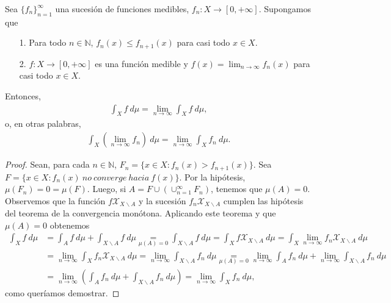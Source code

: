 \begin{teo}
Sea $\{f_n\}_{n=1}^{\infty}$ una sucesión de funciones medibles, $f_n: X \longrightarrow [0,+\infty]$. Supongamos que
\begin{enumerate}
    \item[1.] Para todo $n \in \mathbb{N}$, $f_n(x) \leq f_{n+1}(x)$ para casi todo $x \in X$.
    \item[2.] $f: X \longrightarrow [0,+\infty]$ es una función medible y $f(x) = \lim_{n \to \infty}{f_n(x)}$ para casi todo $x \in X$.
\end{enumerate}
Entonces,
\begin{align*}
    \int_{X}{f \ d\mu} = \lim_{n \to \infty}{\int_{X}{f \ d\mu}},
\end{align*}
o, en otras palabras,
\begin{align*}
    \int_{X}{\left( \lim_{n \to \infty}{f_n}\right) \ d\mu} = \lim_{n \to \infty}{\int_{X}{f_n \ d\mu}}.
\end{align*}
\end{teo}

\begin{proof}
Sean, para cada $n \in \mathbb{N}$, $F_n = \{ x \in X : f_n(x) > f_{n+1}(x) \}$. Sea $F = \{ x \in X : f_n(x) \ no \ converge \ hacia \ f(x)\}$. Por la hipótesis, $\mu(F_n) = 0 = \mu(F)$. Luego, si $A = F \cup (\cup_{n=1}^{\infty}{F_n})$, tenemos que $\mu(A) = 0$. Observemos que la función $f \mathcal{X}_{X \backslash A}$ y la sucesión $f_n \mathcal{X}_{X \backslash A}$ cumplen las hipótesis del teorema de la convergencia monótona. Aplicando este teorema y que $\mu(A) = 0$ obtenemos
\begin{align*}
    \int_{X}{f \ d\mu} &= \int_{A}{f \ d\mu} + \int_{X \backslash A}{f \ d\mu} \underset{\mu(A) = 0}{=} \int_{X \backslash A}{f \ d\mu} = \int_{X}{f \mathcal{X}_{X \backslash A} \ d\mu} = \int_{X}{\lim_{n \to \infty}{f_n}\mathcal{X}_{X \backslash A} \ d\mu}\\
    &= \lim_{n \to \infty}{\int_{X}{f_n \mathcal{X}_{X \backslash A} \ d\mu}} = \lim_{n \to \infty}{\int_{X \backslash A}{f_n \ d\mu}} \underset{\mu(A) = 0}{=} \lim_{n \to \infty}{\int_{A}{f_n \ d\mu}} + \lim_{n \to \infty}{\int_{X \backslash A}{f_n \ d\mu}}\\
    &= \lim_{n \to \infty}{\left(\int_{A}{f_n \ d\mu} + \int_{X \backslash A}{f_n \ d\mu}\right)} = \lim_{n \to \infty}{\int_{X}{f_n \ d\mu}},
\end{align*}
como queríamos demostrar.
\end{proof}

